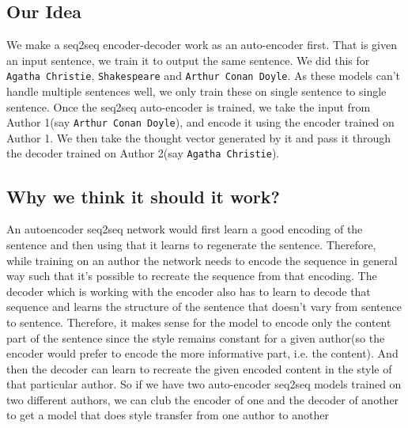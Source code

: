 \documentclass{article} %
\begin{document}
 
\subsection*{Our Idea}
We make a seq2seq encoder-decoder work as an auto-encoder first. That is given an input sentence, we train it to output the same sentence. We did this for \texttt{Agatha Christie}, \texttt{Shakespeare} and \texttt{Arthur Conan Doyle}. As these models can't handle multiple sentences well, we only train these on single sentence to single sentence. Once the seq2seq auto-encoder is trained, we take the input from Author 1(say \texttt{Arthur Conan Doyle}), and encode it using the encoder trained on Author 1. We then take the thought vector generated by it and pass it through the decoder trained on Author 2(say \texttt{Agatha Christie}).\\


\subsection*{Why we think it should it work?}
An autoencoder seq2seq network would first learn a good encoding of the sentence and then using that it learns to regenerate the sentence. Therefore, while training on an author the network needs to encode the sequence in general way such that it's possible to recreate the sequence from that encoding. The decoder which is working with the encoder also has to learn to decode that sequence and learns the structure of the sentence that doesn't vary from sentence to sentence. Therefore,
it makes sense for the model to encode only the content part of the sentence since the style remains constant for a given author(so the encoder would prefer to encode the more informative part, i.e. the content). And then the decoder can learn to recreate the given encoded content in the style of that particular author. So if we have two auto-encoder seq2seq models trained on two different authors, we can club the encoder of one and the decoder of another to get a model that does style transfer from one author to another
\end{document}
